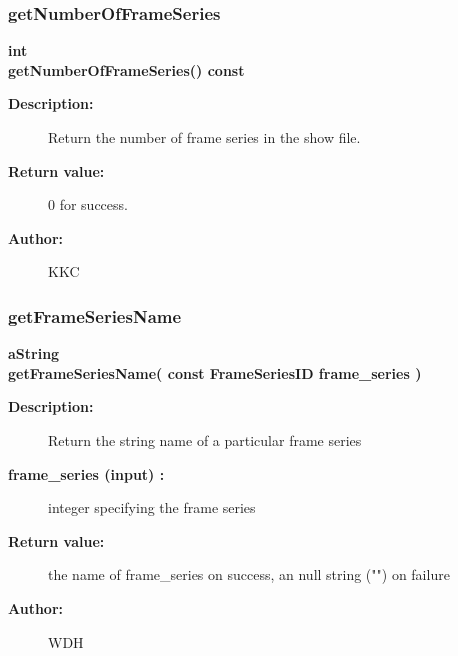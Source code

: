 \subsubsection{getNumberOfFrameSeries}
 
\begin{flushleft} \textbf{%
int  \\ 
\settowidth{\ShowFileReaderIncludeArgIndent}{getNumberOfFrameSeries(}%
getNumberOfFrameSeries() const 
}\end{flushleft}
\begin{description}
\item[{\bf Description:}] 
     Return the number of frame series in the show file.

\item[{\bf Return value:}]  0 for success.
\item[{\bf Author:}]  KKC
\end{description}
\subsubsection{getFrameSeriesName}
 
\begin{flushleft} \textbf{%
aString  \\ 
\settowidth{\ShowFileReaderIncludeArgIndent}{getFrameSeriesName(}%
getFrameSeriesName( const  FrameSeriesID frame\_series )
}\end{flushleft}
\begin{description}
\item[{\bf Description:}] 
     Return the string name of a particular frame series

\item[{\bf frame\_series (input) :}]  integer specifying the frame series

\item[{\bf Return value:}]  the name of frame\_series on success, an null string ("") on failure
\item[{\bf Author:}]  WDH
\end{description}
